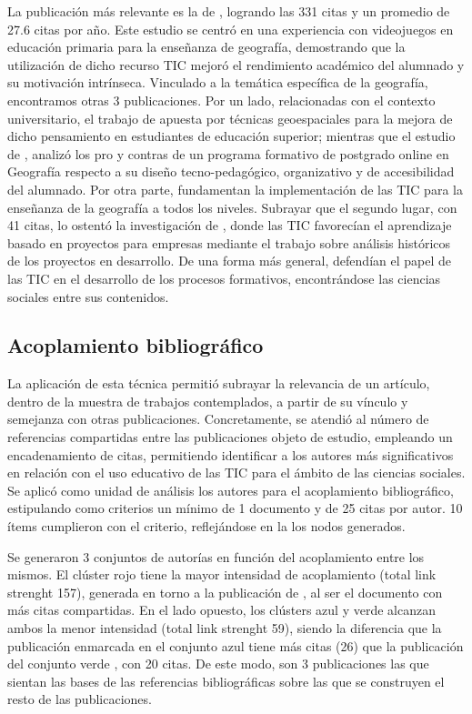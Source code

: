\documentclass[spanish]{textolivre}
\begin{document}
La publicación más relevante es la de \textcite{tuzun2009effects}, logrando las 331 citas y un promedio de 27.6 citas por año. Este estudio se centró en una experiencia con videojuegos en educación primaria para la enseñanza de geografía, demostrando que la utilización de dicho recurso TIC mejoró el rendimiento académico del alumnado y su motivación intrínseca. Vinculado a la temática específica de la geografía, encontramos otras 3 publicaciones. Por un lado, relacionadas con el contexto universitario, el trabajo de \textcite{favier2014effects} apuesta por técnicas geoespaciales para la mejora de dicho pensamiento en estudiantes de educación superior; mientras que el estudio de \textcite{mendler2002virtual}, analizó los pro y contras de un programa formativo de postgrado online en Geografía respecto a su diseño tecno-pedagógico, organizativo y de accesibilidad del alumnado. Por otra parte, \textcite{lynch2008learning} fundamentan la implementación de las TIC para la enseñanza de la geografía a todos los niveles. Subrayar que el segundo lugar, con 41 citas, lo ostentó la investigación de \textcite{maqsood2006applying}, donde las TIC favorecían el aprendizaje basado en proyectos para empresas mediante el trabajo sobre análisis históricos de los proyectos en desarrollo. De una forma más general, \textcite{mcdougall2006theory} defendían el papel de las TIC en el desarrollo de los procesos formativos, encontrándose las ciencias sociales entre sus contenidos. 


\subsection{Acoplamiento bibliográfico}

La aplicación de esta técnica permitió subrayar la relevancia de un artículo, dentro de la muestra de trabajos contemplados, a partir de su vínculo y semejanza con otras publicaciones. Concretamente, se atendió al número de referencias compartidas entre las publicaciones objeto de estudio, empleando un encadenamiento de citas, permitiendo identificar a los autores más significativos en relación con el uso educativo de las TIC para el ámbito de las ciencias sociales. Se aplicó como unidad de análisis los autores para el acoplamiento bibliográfico, estipulando como criterios un mínimo de 1 documento y de 25 citas por autor. 10 ítems cumplieron con el criterio, reflejándose en la  los nodos generados. 

 Se generaron 3 conjuntos de autorías en función del acoplamiento entre los mismos. El clúster rojo tiene la mayor intensidad de acoplamiento (total link strenght 157), generada en torno a la publicación de \textcite{tuzun2009effects}, al ser el documento con más citas compartidas. En el lado opuesto, los clústers azul y verde alcanzan ambos la menor intensidad (total link strenght 59), siendo la diferencia que la publicación enmarcada en el conjunto azul \cite{favier2014effects} tiene más citas (26) que la publicación del conjunto verde \cite{mendler2002virtual}, con 20 citas. De este modo, son 3 publicaciones las que sientan las bases de las referencias bibliográficas sobre las que se construyen el resto de las publicaciones.
\end{document}
